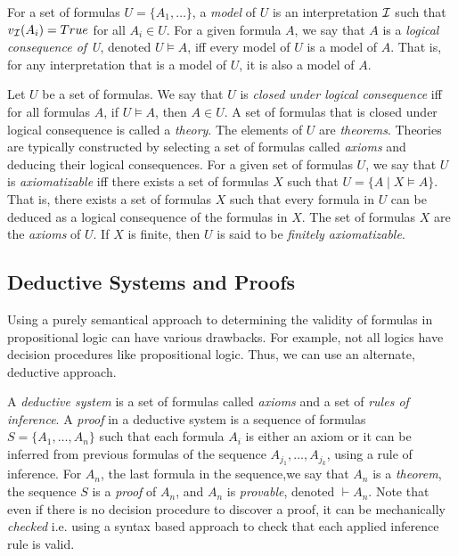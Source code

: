 \documentclass[10pt]{article}
\begin{document}
For a set of formulas $U=\{A_1,\dots\}$, a \textit{model} of $U$ is an interpretation $\mathcal{I}$ such that $v_{\mathcal{I}}(A_i)=True$ for all $A_i \in U$. For a given formula $A$, we say that $A$ is a \textit{logical consequence of U}, denoted $U \vDash A$, iff every model of $U$ is a model of $A$. That is, for any interpretation that is a model of $U$, it is also a model of $A$.

Let $U$ be a set of formulas. We say that $U$ is \textit{closed under logical consequence} iff for all formulas $A$, if $U \vDash A$, then $A \in U$. A set of formulas that is closed under logical consequence is called a \textit{theory}. The elements of $U$ are \textit{theorems}. Theories are typically constructed by selecting a set of formulas called \textit{axioms} and deducing their logical consequences. For a given set of formulas $U$, we say that $U$ is \textit{axiomatizable} iff there exists a set of formulas $X$ such that $U = \{A \mid X \vDash A\}$. That is, there exists a set of formulas $X$ such that every formula in $U$ can be deduced as a logical consequence of the formulas in $X$. The set of formulas $X$ are the \textit{axioms} of $U$. If $X$ is finite, then $U$ is said to be \textit{finitely axiomatizable}. 

\subsection{Deductive Systems and Proofs}

Using a purely semantical approach to determining the validity of formulas in propositional logic can have various drawbacks. For example, not all logics have decision procedures like propositional logic. Thus, we can use an alternate, deductive approach. 

A \textit{deductive system} is a set of formulas called \textit{axioms} and a set of \textit{rules of inference}. A \textit{proof} in a deductive system is a sequence of formulas $S = \{A_1,\dots,A_n\}$ such that each formula $A_i$ is either an axiom or it can be inferred from previous formulas of the sequence $A_{j_1},\dots,A_{j_k}$, using a rule of inference. For $A_n$, the last formula in the sequence,we say that $A_n$ is a \textit{theorem}, the sequence $S$ is a \textit{proof} of $A_n$, and $A_n$ is \textit{provable}, denoted $\vdash A_n$. Note that even if there is no decision procedure to discover a proof, it can be mechanically \textit{checked} i.e. using a syntax based approach to check that each applied inference rule is valid.
\end{document}
